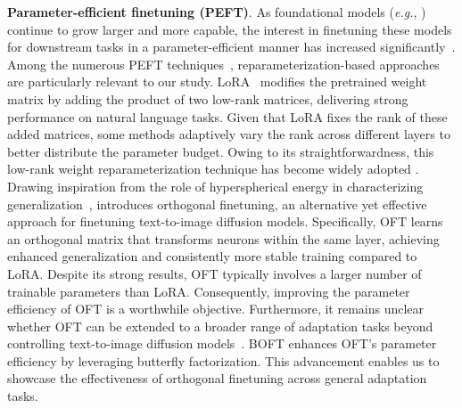 \textbf{Parameter-efficient finetuning (PEFT)}. As foundational models (\emph{e.g.}, \cite{brown2020language,radford2021learning,rombach2022high,kirillov2023segment}) continue to grow larger and more capable, the interest in finetuning these models for downstream tasks in a parameter-efficient manner has increased significantly~\cite{treviso2023efficient,ding2023parameter,lialin2023scaling}. Among the numerous PEFT techniques~\cite{houlsby2019parameter,aghajanyan2020intrinsic,hulora2022,edalati2022krona,wang2022adamix,gheini2021cross,zaken2022bitfit,guo2020parameter,sung2021training,ansell2022composable,lester2021power,li2021prefix,vu2022spot,he2021towards,mao2021unipelt,karimi2021compacter,liu2022few,sung2022lst,chen2022parameter,jia2022visual,chen2022adaptformer,zhang2022neural,jie2023fact,lian2022scaling,luo2023towards}, reparameterization-based approaches~\cite{aghajanyan2020intrinsic,hulora2022,edalati2022krona} are particularly relevant to our study. LoRA~\cite{hulora2022} modifies the pretrained weight matrix by adding the product of two low-rank matrices, delivering strong performance on natural language tasks. Given that LoRA fixes the rank of these added matrices, some methods \cite{zhang2022adaptive,valipour2022dylora,zhang2023increlora} adaptively vary the rank across different layers to better distribute the parameter budget. Owing to its straightforwardness, this low-rank weight reparameterization technique has become widely adopted \cite{dettmers2023qlora,zi2023delta,chavan2023one}. Drawing inspiration from the role of hyperspherical energy in characterizing generalization~\cite{liu2018learning,liu2021orthogonal}, \cite{qiu2023controlling} introduces orthogonal finetuning, an alternative yet effective approach for finetuning text-to-image diffusion models. Specifically, OFT learns an orthogonal matrix that transforms neurons within the same layer, achieving enhanced generalization and consistently more stable training compared to LoRA. Despite its strong results, OFT typically involves a larger number of trainable parameters than LoRA. Consequently, improving the parameter efficiency of OFT is a worthwhile objective. Furthermore, it remains unclear whether OFT can be extended to a broader range of adaptation tasks beyond controlling text-to-image diffusion models~\cite{qiu2023controlling}. BOFT enhances OFT’s parameter efficiency by leveraging butterfly factorization. This advancement enables us to showcase the effectiveness of orthogonal finetuning across general adaptation tasks.

